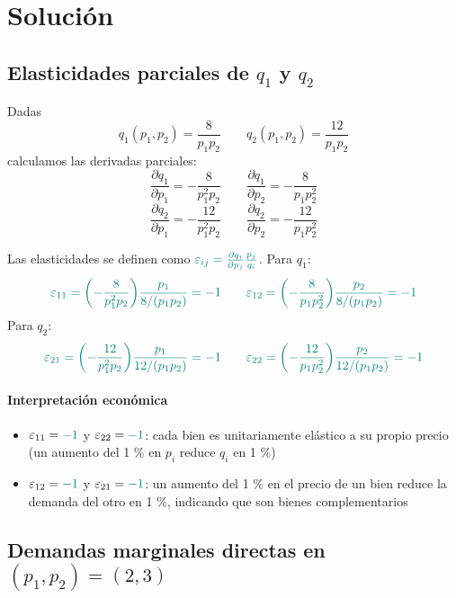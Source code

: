 \documentclass{article}
\begin{document}
\newpage
\section*{Solución}

\subsection*{Elasticidades parciales de \(q_1\) y \(q_2\)}

Dadas
\[
q_1(p_1,p_2) = \frac{8}{p_1p_2}
\qquad
q_2(p_1,p_2) = \frac{12}{p_1p_2}
\]
calculamos las derivadas parciales:
\[
\frac{\partial q_1}{\partial p_1}
=-\frac{8}{p_1^2p_2}
\qquad
\frac{\partial q_1}{\partial p_2}
=-\frac{8}{p_1p_2^2}
\]
\[
\frac{\partial q_2}{\partial p_1}
=-\frac{12}{p_1^2p_2}
\qquad
\frac{\partial q_2}{\partial p_2}
=-\frac{12}{p_1p_2^2}
\]

Las elasticidades se definen como \(\color{teal}\varepsilon_{ij}=\frac{\partial q_i}{\partial p_j}\frac{p_j}{q_i}\).  
Para \(q_1\):
\[\color{teal}
\varepsilon_{11}
=\biggl(-\frac{8}{p_1^2p_2}\biggr)\frac{p_1}{8/(p_1p_2)}
=\color{teal} -1
\qquad
\varepsilon_{12}
=\biggl(-\frac{8}{p_1p_2^2}\biggr)\frac{p_2}{8/(p_1p_2)}
=\color{teal} -1
\]
Para \(q_2\):
\[\color{teal}
\varepsilon_{21}
=\biggl(-\frac{12}{p_1^2p_2}\biggr)\frac{p_1}{12/(p_1p_2)}
=\color{teal} -1
\qquad
\varepsilon_{22}
=\biggl(-\frac{12}{p_1p_2^2}\biggr)\frac{p_2}{12/(p_1p_2)}
=\color{teal} -1
\]

\paragraph{Interpretación económica}
\begin{itemize}
  \item \(\varepsilon_{11}=\color{teal} -1\) y \(\varepsilon_{22}=\color{teal} -1\): cada bien es {\color{teal} unitariamente elástico} a su propio precio (un aumento del 1 \% en \(p_i\) reduce \(q_i\) en 1 \%)
  \item \(\varepsilon_{12}=\color{teal} -1\) y \(\varepsilon_{21}=\color{teal} -1\): un aumento del 1 \% en el precio de un bien reduce la demanda del otro en 1 \%, indicando que son bienes {\color{teal} complementarios}
\end{itemize}



\subsection*{Demandas marginales directas en \((p_1,p_2)=(2,3)\)}
\end{document}
